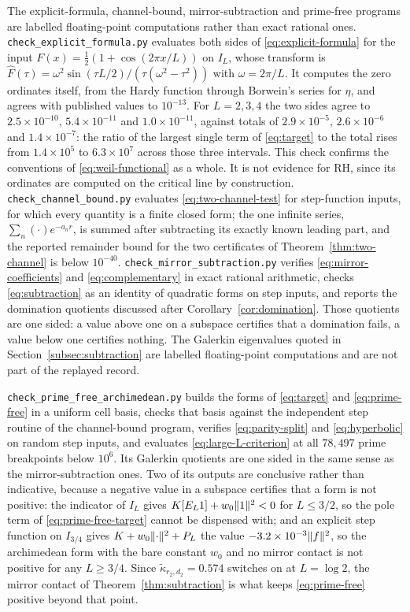 The explicit-formula, channel-bound, mirror-subtraction and prime-free
programs are labelled floating-point computations rather than exact rational
ones. \texttt{check\_explicit\_formula.py} evaluates
both sides of \eqref{eq:explicit-formula} for the input
$F(x)=\tfrac12(1+\cos(2\pi x/L))$ on $I_L$, whose transform is
$\widehat F(\tau)=\omega^2\sin(\tau L/2)/(\tau(\omega^2-\tau^2))$ with
$\omega=2\pi/L$. It computes the zero ordinates itself, from the Hardy
function through Borwein's series for $\eta$, and agrees with published
values to $10^{-13}$. For $L=2,3,4$ the two sides agree to
$2.5\times10^{-10}$, $5.4\times10^{-11}$ and $1.0\times10^{-11}$, against
totals of $2.9\times10^{-5}$, $2.6\times10^{-6}$ and $1.4\times10^{-7}$:
the ratio of the largest single term of \eqref{eq:target} to the total rises
from $1.4\times10^5$ to $6.3\times10^7$ across those three intervals. This
check confirms the conventions of \eqref{eq:weil-functional} as a whole. It
is not evidence for RH, since its ordinates are computed on the critical
line by construction.
\texttt{check\_channel\_bound.py} evaluates \eqref{eq:two-channel-test} for
step-function inputs, for which every quantity is a finite closed form; the
one infinite series, $\sum_n(\cdot)e^{-a_nr}$, is summed after subtracting
its exactly known leading part, and the reported remainder bound for the two
certificates of Theorem~\ref{thm:two-channel} is below $10^{-40}$.
\texttt{check\_mirror\_subtraction.py} verifies
\eqref{eq:mirror-coefficients} and \eqref{eq:complementary} in exact rational
arithmetic, checks \eqref{eq:subtraction} as an identity of quadratic forms on
step inputs, and reports the domination quotients discussed after
Corollary~\ref{cor:domination}. Those quotients are one sided: a value above
one on a subspace certifies that a domination fails, a value below one
certifies nothing. The Galerkin eigenvalues quoted in
Section~\ref{subsec:subtraction} are labelled floating-point computations and
are not part of the replayed record.

\texttt{check\_prime\_free\_archimedean.py} builds the forms of
\eqref{eq:target} and \eqref{eq:prime-free} in a uniform cell basis, checks
that basis against the independent step routine of the channel-bound program,
verifies \eqref{eq:parity-split} and \eqref{eq:hyperbolic} on random step
inputs, and evaluates \eqref{eq:large-L-criterion} at all $78{,}497$ prime
breakpoints below $10^6$. Its Galerkin quotients are one sided in the same
sense as the mirror-subtraction ones. Two of its outputs are conclusive rather
than indicative, because a negative value in a subspace certifies that a form
is not positive: the indicator of $I_L$ gives
$K[E_L1]+w_0\lVert 1\rVert^2<0$ for $L\leq3/2$, so the pole term of
\eqref{eq:prime-free-target} cannot be dispensed with; and an explicit step
function on $I_{3/4}$ gives $K+w_0\lVert \cdot\rVert^2+P_L$ the value
$-3.2\times10^{-3}\lVert f\rVert^2$, so the archimedean form with the bare constant
$w_0$ and no mirror contact is not positive for any $L\geq3/4$. Since
$\widetilde\kappa_{r_2,d_2}=0.574$ switches on at $L=\log2$, the mirror
contact of Theorem~\ref{thm:subtraction} is what keeps \eqref{eq:prime-free}
positive beyond that point.

